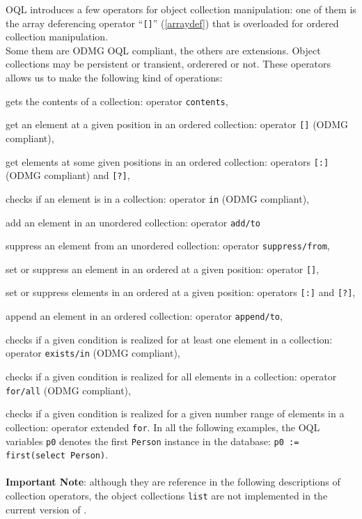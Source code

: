 \label{collexp}
OQL introduces a few operators for object collection manipulation:
one of them is the array deferencing operator ``\texttt{[]}''
(\ref{arraydef}) that
is overloaded for ordered collection manipulation.\\
Some them are ODMG OQL compliant, the others are \eyedb extensions.
Object collections may be persistent or transient, orderered or not.
These operators allows us to make the following kind of operations:
\be
\item gets the contents of a collection: operator \texttt{contents},
\item get an element at a given position in an ordered collection:
operator \texttt{[]} (ODMG compliant),
\item get elements at some given positions in an ordered collection:
operators \texttt{[:]} (ODMG compliant) and \texttt{[?]},
\item checks if an element is in a collection: operator \texttt{in} (ODMG
compliant),
\item add an element in an unordered collection:
operator \texttt{add/to}
\item suppress an element from an unordered collection:
operator \texttt{suppress/from},
\item set or suppress an element in an ordered at a given position:
operator \texttt{[]},
\item set or suppress elements in an ordered at a given position:
operators \texttt{[:]} and \texttt{[?]},
\item append an element in an ordered collection:
operator \texttt{append/to},
\item checks if a given condition is realized for at least one
element in a collection: operator \texttt{exists/in} (ODMG compliant),
\item checks if a given condition is realized for all
elements in a collection: operator \texttt{for/all} (ODMG compliant),
\item checks if a given condition is realized for a given
number range of elements in a collection: operator extended \texttt{for}.
\ee
In all the following examples, the OQL variables \texttt{p0} denotes
the first \texttt{Person} instance in the database:
\texttt{p0 := first(select Person)}.\\\\
{\bf Important Note}: although they are reference in the following
descriptions of collection operators,
the object collections \texttt{list} are not
implemented in the current version of \eyedbX. 
